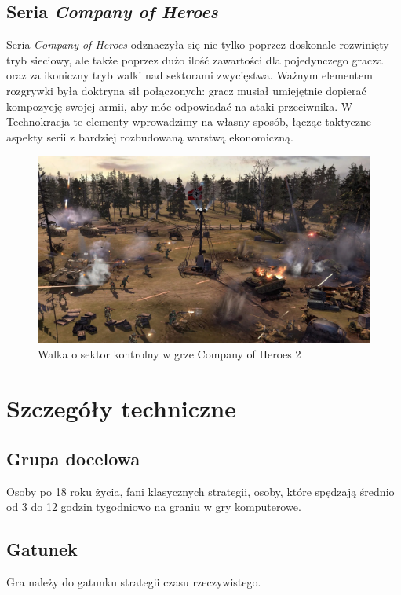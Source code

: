 \documentclass[a4paper]{scrreprt}
\def \GameTiTle{Technokracja}
\begin{document}
\section{Seria \emph{Company of Heroes}}
Seria \emph{Company of Heroes} odznaczyła się nie tylko poprzez doskonale rozwinięty tryb sieciowy, ale także poprzez dużo ilość zawartości dla pojedynczego gracza oraz za ikoniczny tryb walki nad sektorami zwycięstwa. Ważnym elementem rozgrywki była doktryna sił połączonych: gracz musiał umiejętnie dopierać kompozycję swojej armii, aby móc odpowiadać na ataki przeciwnika. 
W \GameTiTle{} te elementy wprowadzimy na własny sposób, łącząc taktyczne aspekty serii z bardziej rozbudowaną warstwą ekonomiczną.

\begin{figure}[hb]
    \centering
    \includegraphics[width=1\textwidth]{coh2.jpg}
    \caption{\label{} Walka o sektor kontrolny w grze Company of Heroes 2}
    \end{figure}


\chapter{Szczegóły techniczne}

\section{Grupa docelowa}
Osoby po 18 roku życia, fani klasycznych strategii, osoby, które spędzają średnio od 3 do 12 godzin tygodniowo na graniu w gry komputerowe.

\section{Gatunek}
Gra należy do gatunku strategii czasu rzeczywistego.
\end{document}
